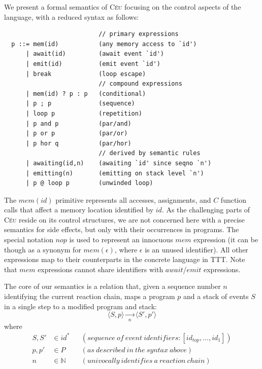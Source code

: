 \documentclass{acm_proc_article-sp}
\newcommand{\CEU}{\textsc{C\'{e}u}\xspace}
\newcommand{\LL}{\langle}
\newcommand{\RR}{\rangle}
\newcommand{\1}{\;}
\newcommand{\2}{\;\;}
\newcommand{\3}{\;\;\;}
\newcommand{\5}{\;\;\;\;\;}
\begin{document}
We present a formal semantics of \CEU focusing on the control aspects of the 
language, with a reduced syntax as follows:
%
{\small
\begin{verbatim}
                          // primary expressions
  p ::= mem(id)           (any memory access to `id')
      | await(id)         (await event `id')
      | emit(id)          (emit event `id')
      | break             (loop escape)
                          // compound expressions
      | mem(id) ? p : p   (conditional)
      | p ; p             (sequence)
      | loop p            (repetition)
      | p and p           (par/and)
      | p or p            (par/or)
      | p hor q           (par/hor)
                          // derived by semantic rules
      | awaiting(id,n)    (awaiting `id' since seqno `n')
      | emitting(n)       (emitting on stack level `n')
      | p @ loop p        (unwinded loop)
\end{verbatim}
}%
%
The $mem(id)$ primitive represents all accesses, assignments, and $C$ function 
calls that affect a memory location identified by $id$.
As the challenging parts of \CEU reside on its control structures, we are not 
concerned here with a precise semantics for side effects, but only with their 
occurrences in programs.
%
The special notation $nop$ is used to represent an innocuous $mem$ expression 
(it can be though as a synonym for $mem(\epsilon)$, where $\epsilon$ is an 
unused identifier).
%
All other expressions map to their counterparts in the concrete language in 
TTT.
%
Note that $mem$ expressions cannot share identifiers with $await$/$emit$ 
expressions.

The core of our semantics is a relation that, given a sequence number $n$ 
identifying the current reaction chain, maps a program $p$ and a stack of 
events $S$ in a single step to a modified program and stack:
%
$$
\LL S, p \RR
    \xrightarrow[~~n~~]{}
\LL S', p' \RR
$$
%
where
%
\begin{align*}
S, S' &\in id^*
    &&(sequence~of~event~identifiers: [id_{top}, ..., id_1]) \\
p, p' &\in P
    && (as~described~in~the~syntax~above) \\
n     &\in \mathds{N}
    && (univocally~identifies~a~reaction~chain)
\end{align*}
\end{document}
